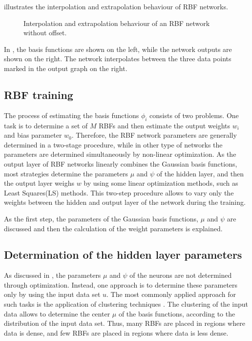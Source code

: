  illustrates the interpolation and extrapolation behaviour of RBF networks. 

\begin{figure}[H]
\centering
 
\caption{Interpolation and extrapolation behaviour of an RBF network without offset.}
\label{fig:rbf_interpol}
\end{figure}

\vspace{-3mm}

In , the basis functions are shown on the left, while the network outputs are shown on the right. The network interpolates  between the three data points marked in the output graph on the right. 

\subsection{RBF training}
\label{RBF_training}

The process of estimating the basis functions $\phi_i$ consists of two problems. One task is to determine a set of $M$ RBFs and then estimate the output weights $w_i$ and bias parameter $w_0$. Therefore, the RBF network parameters are generally determined in a two-stage procedure, while in other type of networks the parameters are determined simultaneously by non-linear optimization\cite{RBF_article}. As the output layer of RBF networks linearly combines the Gaussian basis functions, most strategies determine the parameters $\mu$ and $\psi$ of the hidden layer, and then the output layer weighs $w$ by using some linear optimization methods, such as Least Squares(LS) methods. This two-step procedure allows to vary only the weights between the hidden and output layer of the network during the training. 

As the first step, the parameters of the Gaussian basis functions, $\mu$ and $\psi$ are discussed and then the calculation of the weight parameters is explained. 

\subsection{Determination of the hidden layer parameters}
\label{determination_hidden_layer}

As discussed in , the parameters $\mu$ and $\psi$ of the neurons are not determined through optimization. Instead, one approach is to determine these parameters only by using the input data set $u$. The most commonly applied approach for such tasks is the application of clustering techniques \cite{nelles2013nonlinear}. The clustering of the input data allows to determine the center $\mu$ of the basis functions, according to the distribution of the input data set. Thus, many RBFs are placed in regions where data is dense, and few RBFs are placed in regions where data is less dense.  

